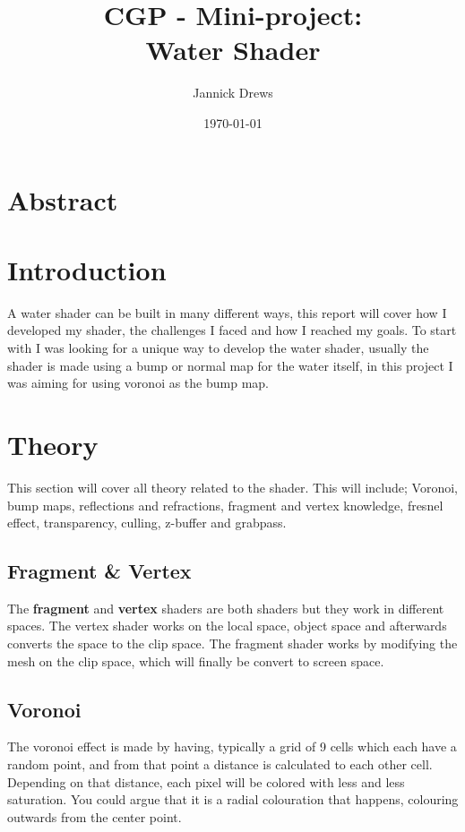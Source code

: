 \documentclass{article}
\title{CGP - Mini-project:\\Water Shader}
\author{Jannick Drews}
\date{\today}
\begin{document}
\maketitle
\newpage
{}


\section{Abstract}
\label{sec:abstract}


\section{Introduction}
\label{sec:introduction}
A water shader can be built in many different ways, this report will cover how I developed my shader, the challenges I faced and how I reached my goals. To start with I was looking for a unique way to develop the water shader, usually the shader is made using a bump or normal map for the water itself, in this project I was aiming for using voronoi as the bump map.

\section{Theory}
\label{sec:theory}
This section will cover all theory related to the shader. This will include; Voronoi, bump maps, reflections and refractions, fragment and vertex knowledge, fresnel effect, transparency, culling, z-buffer and grabpass.

\subsection{Fragment \& Vertex}
\label{sec:frag_vert}
The \textbf{fragment} and \textbf{vertex} shaders are both shaders but they work in different spaces. The vertex shader works on the local space, object space and afterwards converts the space to the clip space. The fragment shader works by modifying the mesh on the clip space, which will finally be convert to screen space.


\subsection{Voronoi}
\label{sec:voronoi}
The voronoi effect is made by having, typically a grid of 9 cells which each have a random point, and from that point a distance is calculated to each other cell. Depending on that distance, each pixel will be colored with less and less saturation. You could argue that it is a radial colouration that happens, colouring outwards from the center point.\\
\end{document}
